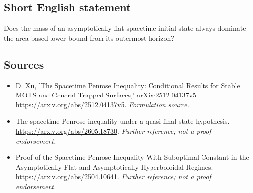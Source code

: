 \documentclass[11pt]{article}
\begin{document}
\subsection{Short English statement}
Does the mass of an asymptotically flat spacetime initial state always dominate the area-based lower bound from its outermost horizon?
\subsection{Sources}
\begin{itemize}
\item[S1]D. Xu, 'The Spacetime Penrose Inequality: Conditional Results for Stable MOTS and General Trapped Surfaces,' arXiv:2512.04137v5.
\url{https://arxiv.org/abs/2512.04137v5}.
\textit{Formulation source.}
\item[S2]The spacetime Penrose inequality under a quasi final state hypothesis.
\url{https://arxiv.org/abs/2605.18730}.
\textit{Further reference; not a proof endorsement.}
\item[S3]Proof of the Spacetime Penrose Inequality With Suboptimal Constant in the Asymptotically Flat and Asymptotically Hyperboloidal Regimes.
\url{https://arxiv.org/abs/2504.10641}.
\textit{Further reference; not a proof endorsement.}
\end{itemize}
\end{document}
